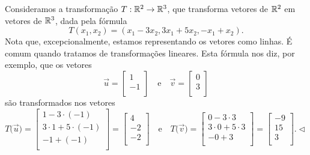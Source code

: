\documentclass[../livro.tex]{subfiles}
\begin{document}
\begin{example}\label{exp:7}
Consideramos a transformação $T: \mathbb{R}^2 \to \mathbb{R}^3$, que transforma vetores de $\mathbb{R}^2$ em vetores de $\mathbb{R}^3$, dada pela fórmula
\begin{equation}
T(x_1, x_2) = (x_1 - 3 x_2, 3x_1 + 5x_2, -x_1 + x_2).
\end{equation} Nota que, excepcionalmente, estamos representando os vetores como linhas. É comum quando tratamos de transformações lineares. Esta fórmula nos diz, por exemplo, que os vetores
\begin{equation}
\vec{u} =
\left[
  \begin{array}{c}
    1 \\
    -1 \\
  \end{array}
\right] \quad \text{e} \quad 
\vec{v} =
\left[
  \begin{array}{c}
    0 \\
    3 \\
  \end{array}
\right]
\end{equation} são transformados nos vetores
\begin{equation}
T\big(\vec{u}\big) =
\left[
  \begin{array}{c}
    1-3\cdot(-1) \\
    3\cdot 1 + 5\cdot(-1) \\
    -1 + (-1)\\
  \end{array}
\right] =
\left[
  \begin{array}{r}
     4 \\
    -2 \\
    -2 \\
  \end{array}
\right] \quad \text{e} \quad
T\big(\vec{v}\big) =
\left[
  \begin{array}{c}
    0-3\cdot 3 \\
    3\cdot 0 + 5\cdot 3 \\
    -0 + 3 \\
  \end{array}
\right] =
\left[
  \begin{array}{r}
    -9 \\
    15 \\
     3 \\
  \end{array}
\right].\lhd
\end{equation}
\end{example}
\end{document}

